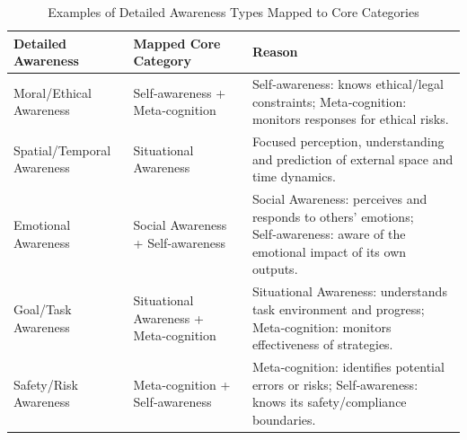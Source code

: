 \begin{table}[htbp]
\centering
\caption{Examples of Detailed Awareness Types Mapped to Core Categories}
\label{tab:awareness-mapping}
\renewcommand{\arraystretch}{1.1} %
\setlength\tabcolsep{6pt}        %
\begin{tabular}{@{}p{2.5cm}p{2.5cm}p{7.5cm}@{}}
\toprule
\textbf{Detailed Awareness} & \textbf{Mapped Core Category} & \textbf{Reason} \\
\midrule
Moral/Ethical Awareness 
  & Self‑awareness + Meta‑cognition 
  & Self‑awareness: knows ethical/legal constraints;\newline
    Meta‑cognition: monitors responses for ethical risks. \\

Spatial/Temporal Awareness 
  & Situational Awareness 
  & Focused perception, understanding and prediction of external space and time dynamics. \\

Emotional Awareness 
  & Social Awareness + Self‑awareness 
  & Social Awareness: perceives and responds to others’ emotions;\newline
    Self‑awareness: aware of the emotional impact of its own outputs. \\

Goal/Task Awareness 
  & Situational Awareness + Meta‑cognition 
  & Situational Awareness: understands task environment and progress;\newline
    Meta‑cognition: monitors effectiveness of strategies. \\

Safety/Risk Awareness 
  & Meta‑cognition + Self‑awareness 
  & Meta‑cognition: identifies potential errors or risks;\newline
    Self‑awareness: knows its safety/compliance boundaries. \\
\bottomrule
\end{tabular}
\end{table}

